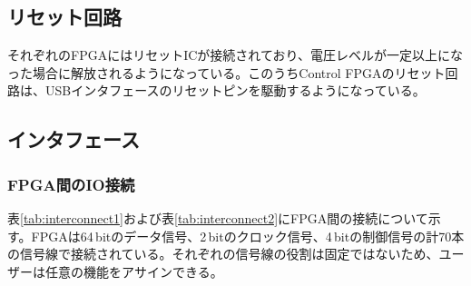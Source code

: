\documentclass[dvipdfmx]{jlreq}
\begin{document}
\subsection{リセット回路}
それぞれのFPGAにはリセットICが接続されており、電圧レベルが一定以上になった場合に解放されるようになっている。このうちControl FPGAのリセット回路は、USBインタフェースのリセットピンを駆動するようになっている。

\subsection{インタフェース}

\subsubsection{FPGA間のIO接続}
表\ref{tab:interconnect1}および表\ref{tab:interconnect2}にFPGA間の接続について示す。FPGAは64\,bitのデータ信号、2\,bitのクロック信号、4\,bitの制御信号の計70本の信号線で接続されている。それぞれの信号線の役割は固定ではないため、ユーザーは任意の機能をアサインできる。
\end{document}
